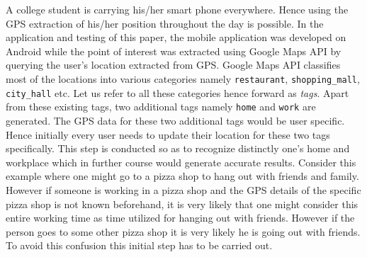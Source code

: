 \documentclass[conference]{IEEEtran}
\begin{document}
A college student is carrying his/her smart phone everywhere. Hence using the GPS extraction of his/her position throughout the day is possible. In the application and testing of this paper, the mobile application was developed on Android while the point of interest was extracted using Google Maps API by querying the user\rq s location extracted from GPS. Google Maps API classifies most of the locations into various categories namely \texttt{restaurant}, \texttt{shopping\_mall}, \texttt{city\_hall} etc. Let us refer to all these categories hence forward as \textit{tags}. Apart from these existing tags, two additional tags namely \texttt{home} and \texttt{work} are generated. The GPS data for these two additional tags would be user specific. Hence initially every user needs to update their location for these two tags specifically. This step is conducted so as to recognize distinctly one\rq s home and workplace which in further course would generate accurate results. Consider this example where one might go to a pizza shop to hang out with friends and family. However if someone is working in a pizza shop and the GPS details of the specific pizza shop is not known beforehand, it is very likely that one might consider this entire working time as time utilized for hanging out with friends. However if the person goes to some other pizza shop it is very likely he is going out with friends. To avoid this confusion this initial step has to be carried out.
\end{document}
